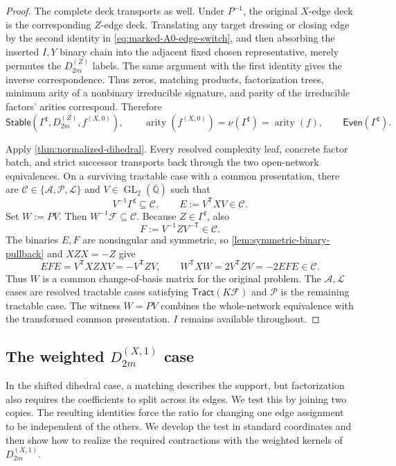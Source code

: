 \documentclass[11pt,letterpaper,onecolumn]{article}
\theoremstyle{plain}
\theoremstyle{definition}
\theoremstyle{remark}
\newcommand{\AlgNums}{\overline{\mathbb Q}}
\newcommand{\cF}{\mathcal F}
\newcommand{\cA}{\mathscr A}
\newcommand{\cP}{\mathscr P}
\newcommand{\cL}{\mathscr L}
\newcommand{\cC}{\mathscr C}
\newcommand{\Tract}{\mathsf{Tract}}
\newcommand{\DihZ}[1]{{D_{#1}^{(Z)}}}
\newcommand{\DihXone}[1]{{D_{#1}^{(X,1)}}}
\newcommand{\Stable}{\mathsf{Stable}}
\newcommand{\Even}{\mathsf{Even}}
\newcommand{\GL}{\operatorname{GL}}
\newcommand{\arity}{\operatorname{arity}}
\begin{document}
\begin{proof}
The complete deck transports as well.  Under \(P^{-1}\), the original
\(X\)-edge deck is the corresponding \(Z\)-edge deck.  Translating any
target dressing or closing edge by the second identity in
\cref{eq:marked-A0-edge-switch}, and then absorbing the inserted \(I,Y\)
binary chain into the adjacent fixed chosen representative, merely permutes
the \(\DihZ{2m}\) labels.  The same argument with the first identity gives
the inverse correspondence.  Thus zeros, matching products, factorization trees,
minimum arity of a nonbinary irreducible signature, and parity of the irreducible factors' arities correspond.  Therefore
\[
 \Stable(\Gamma^\sharp,\DihZ{2m},f^{(X,0)}),
 \qquad
 \arity(f^{(X,0)})=\nu(\Gamma^\sharp)=\arity(f),
 \qquad
 \Even(\Gamma^\sharp).
\]

Apply \cref{thm:normalized-dihedral}.  Every resolved complexity leaf, concrete factor
batch, and strict successor transports back through the two open-network
equivalences.  On a surviving tractable case with a common presentation, there are
\(\cC\in\{\cA,\cP,\cL\}\) and \(V\in\GL_2(\AlgNums)\) such that
\[
 V^{-1}\Gamma^\sharp\subseteq\cC,
 \qquad
 E:=V^{\mathsf T}XV\in\cC.
\]
Set \(W:=PV\).  Then \(W^{-1}\cF\subseteq\cC\).  Because
\(Z\in\Gamma^\sharp\), also
\[
 F:=V^{-1}ZV^{-\mathsf T}\in\cC.
\]
The binaries \(E,F\) are nonsingular and symmetric, so
\cref{lem:symmetric-binary-pullback} and \(XZX=-Z\) give
\[
 EFE=V^{\mathsf T}XZXV=-V^{\mathsf T}ZV,
 \qquad
 W^{\mathsf T}XW
 =2V^{\mathsf T}ZV
 =-2EFE\in\cC.
\]
Thus \(W\) is a common change-of-basis matrix for the original problem.  The
\(\cA,\cL\) cases are resolved tractable cases satisfying \(\Tract(K\cF)\) and \(\cP\) is
the remaining tractable case.  The witness \(W=PV\) combines the
whole-network equivalence with the transformed common presentation.
\(I\) remains available throughout.
\end{proof}

\subsection{The weighted \texorpdfstring{\(\DihXone{2m}\)}{D2m (X,1)} case}
\label{subsec:weighted-dihedral-case}

In the shifted dihedral case, a matching describes the support, but
factorization also requires the coefficients to split across its edges.
We test this by joining two copies. The resulting identities force the
ratio for changing one edge assignment to be independent of the others.
We develop the test in standard coordinates and then show how to realize
the required contractions with the weighted kernels of \(\DihXone{2m}\).
\end{document}
